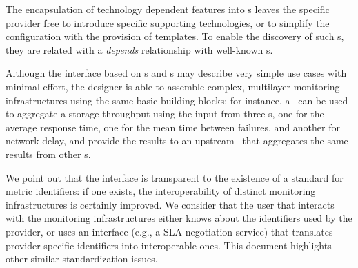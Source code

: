 \documentclass[10pt]{article}  %
\begin{document}
The encapsulation of technology dependent features into \mi s leaves the specific provider free to introduce specific supporting technologies, or to simplify the configuration with the provision of templates. To enable the discovery of such \mi s, they are related with a {\em depends} relationship with well-known \mi s.



Although the interface based on \sens s and \coll s may describe very simple use cases with minimal effort, the designer is able to assemble complex, multilayer monitoring infrastructures using the same basic building blocks: for instance, a \sens\ can be used to aggregate a storage throughput using the input from three \coll s, one for the average response time, one for the mean time between failures, and another for network delay, and provide the results to an upstream \sens\ that aggregates the same results from other \sens s.



We point out that the interface is transparent to the existence of a standard for metric identifiers: if one exists, the interoperability of distinct monitoring infrastructures is certainly improved. We consider that the user that interacts with the monitoring infrastructures either knows about the identifiers used by the provider, or uses an interface (e.g., a SLA negotiation service) that translates provider specific identifiers into interoperable ones. This document highlights other similar standardization issues.
\end{document}
